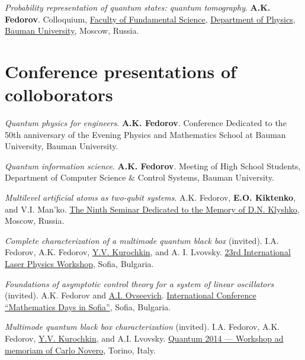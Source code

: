 \documentclass[10pt,a4paper,sans]{moderncv}
\begin{document}
	{\textit{Probability representation of quantum states: quantum tomography}.
	\textbf{A.K. Fedorov}.
	Colloquium, 
	\textcolor{blue}{\href{http://fn.bmstu.ru/}{Faculty of Fundamental Science}},
	\textcolor{blue}{\href{http://fn.bmstu.ru/index.php/fn4}{Department of Physics}},
	\textcolor{blue}{\href{http://bmstu.ru/}{Bauman University}}, Moscow, Russia.}
	
\iffalse
	
\section{Conference presentations of colloborators}

	{\textit{Quantum physics for engineers}. 
	\textbf{A.K. Fedorov}.
	Conference Dedicated to the 50th anniversary  of the Evening Physics and Mathematics School at Bauman University, Bauman University.}

	
	{\textit{Quantum information science}.
	\textbf{A.K. Fedorov}.
	Meeting of High School Students, Department of Computer Science \& Control Systems, Bauman University.}
	
	{\textit{Multilevel artificial atoms as two-qubit systems}.
	A.K. Fedorov, \textbf{E.O. Kiktenko}, and V.I. Man'ko.
	\textcolor{blue}{\href{http://qopt.org/seminardnk}{The Ninth Seminar Dedicated to the Memory of D.N. Klyshko}}, Moscow, Russia.}





	{\textit{Complete characterization of a multimode quantum black box}
	({invited}).
	I.A. Fedorov, A.K. Fedorov, \underline{Y.V. Kurochkin}, and A. I. Lvovsky.
	\textcolor{blue}{\href{http://www.lasphys.com/workshops/lasphys14/}{23rd International Laser Physics Workshop}},
	Sofia, Bulgaria.}
	
	{\textit{Foundations of asymptotic control theory for a system of linear oscillators}
	({invited}).
	A.K. Fedorov and \underline{A.I. Ovseevich}.
	\textcolor{blue}{\href{http://www.math.bas.bg/mds2014/}{International Conference ``Mathematics Days in Sofia''}},
	Sofia, Bulgaria.}
	
	{\textit{Multimode quantum black box characterization}
	({invited}).
	I.A. Fedorov, A.K. Fedorov, \underline{Y.V. Kurochkin}, and A.I. Lvovsky.
	\textcolor{blue}{\href{http://www.inrim.it/~brida/Quantum_2014/}{Quantum 2014 --- Workshop ad memoriam of Carlo Novero}},
	Torino, Italy.}
	
\end{document}
